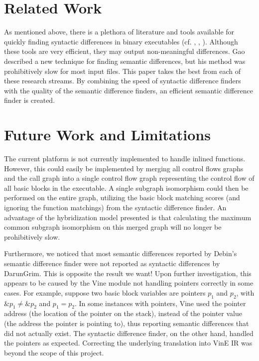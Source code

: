 \documentclass[11pt,twocolumn]{article}
\begin{document}
\section{Related Work}

As mentioned above, there is a plethora of literature and tools available for quickly finding syntactic differences in binary executables (cf. \cite{BinDiff2}, \cite{eEye},  \cite{BinDiff}).  Although these tools are very efficient, they may output non-meaningful differences.   Gao \cite{sdibe} described a new technique for finding semantic differences, but his method was prohibitively slow for most input files.  This paper takes the best from each of these research streams.  By combining the speed of syntactic difference finders with the quality of the semantic difference finders, an efficient semantic difference finder is created.


\section{Future Work and Limitations}

The current platform is not currently implemented to handle inlined functions.  However, this could easily be implemented by merging all control flows graphs and the call graph into a single control flow graph representing the control flow of all basic blocks in the executable.  A single subgraph isomorphism could then be performed on the entire graph, utilizing  the basic block matching scores (and ignoring the function matchings) from the syntactic difference finder.  An advantage of the hybridization model presented is that calculating the maximum common subgraph isomorphism on this merged graph will no longer be prohibitively slow.

Furthermore, we noticed that most semantic differences reported by Debin's semantic difference finder were not reported as syntactic differences by DarunGrim.  This is opposite the result we want!   Upon further investigation, this appears to be caused by the Vine module not handling pointers correctly in some cases. 
For example, suppose two basic block variables are pointers $p_1$ and $p_2$, with $\&p_1 \neq \&p_2$ and $p_1 = p_2$.  In some instances with pointers, Vine used the pointer address (the location of the pointer on the stack), instead of the pointer value (the address the pointer is pointing to), thus reporting semantic differences that did not actually exist.  The syntactic difference finder, on the other hand, handled the pointers as expected. 
Correcting the underlying translation into VinE IR was beyond the scope of this project. 
\end{document}
